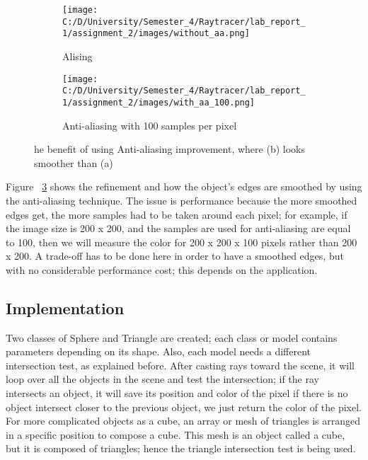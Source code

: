 \documentclass{article}
\begin{document}
	\begin{figure}[ht]
		\begin{center}
			\begin{subfigure}{.3\textwidth}
				\centering
				\texttt{[image: C:/D/University/Semester\_4/Raytracer/lab\_report\_1/assignment\_2/images/without\_aa.png]}  
				\caption{Alising}
				\label{fig:sub-first}
			\end{subfigure}
			\begin{subfigure}{.3\textwidth}
				\centering
				\texttt{[image: C:/D/University/Semester\_4/Raytracer/lab\_report\_1/assignment\_2/images/with\_aa\_100.png]}  
				\caption{Anti-aliasing with 100 samples per pixel}
				\label{fig:sub-second}
			\end{subfigure}
			
			\caption{he benefit of using Anti-aliasing improvement, where (b) looks smoother than (a)}
			\label{fig:4}
		\end{center}
	\end{figure}
	
	
	Figure ~\ref{fig:4} shows the refinement and how the object's edges are smoothed by using the anti-aliasing technique. The issue is performance because the more smoothed edges get, the more samples had to be taken around each pixel; for example, if the image size is 200 x 200, and the samples are used for anti-aliasing are equal to 100, then we will measure the color for 200 x 200 x 100 pixels rather than 200 x 200. 
	A trade-off has to be done here in order to have a smoothed edges, but with no considerable performance cost; this depends on the application. 
	
	
	\subsection{Implementation}
	Two classes of Sphere and Triangle are created; each class or model contains parameters depending on its shape. Also, each model needs a different intersection test, as explained before. 
	After casting rays toward the scene, it will loop over all the objects in the scene and test the intersection; if the ray intersects an object, it will save its position and color of the pixel if there is no object intersect closer to the previous object, we just return the color of the pixel. 
	For more complicated objects as a cube, an array or mesh of triangles is arranged in a specific position to compose a cube. This mesh is an object called a cube, but it is composed of triangles; hence the triangle intersection test is being used.
	
\end{document}
